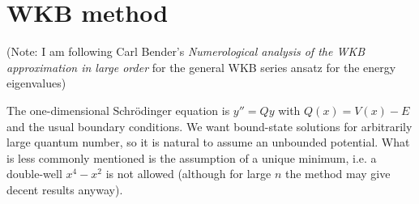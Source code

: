 \documentclass[english, parskip=full]{scrartcl}
\title{\Title}
\author{\Author}
\date{\today}
\begin{document}
\maketitle  %

\section{WKB method} %
(Note: I am following Carl Bender's \emph{Numerological analysis of the WKB approximation in large order} for the general WKB series ansatz for the energy eigenvalues)

The one-dimensional Schrödinger equation is $y''=Qy$ with $Q(x)=V(x)-E$ and the usual boundary conditions.
We want bound-state solutions for arbitrarily large quantum number, so it is natural to assume an unbounded potential.
What is less commonly mentioned is the assumption of a unique minimum, i.e. a double-well $x^4-x^2$ is not allowed (although for large $n$ the method may give decent results anyway).
\end{document}
